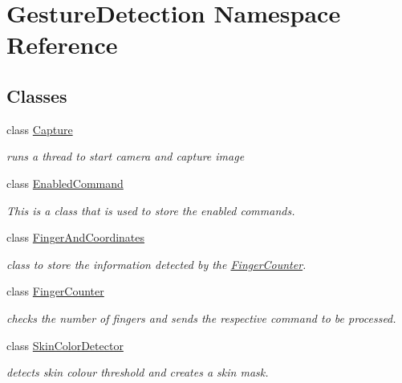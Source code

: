 \hypertarget{namespace_gesture_detection}{}\section{Gesture\+Detection Namespace Reference}
\label{namespace_gesture_detection}
\subsection*{Classes}
\begin{DoxyCompactItemize}
\item 
class \hyperlink{class_gesture_detection_1_1_capture}{Capture}
\begin{DoxyCompactList}\small\item\em runs a thread to start camera and capture image \end{DoxyCompactList}\item 
class \hyperlink{class_gesture_detection_1_1_enabled_command}{Enabled\+Command}
\begin{DoxyCompactList}\small\item\em This is a class that is used to store the enabled commands. \end{DoxyCompactList}\item 
class \hyperlink{class_gesture_detection_1_1_finger_and_coordinates}{Finger\+And\+Coordinates}
\begin{DoxyCompactList}\small\item\em class to store the information detected by the \hyperlink{class_gesture_detection_1_1_finger_counter}{Finger\+Counter}. \end{DoxyCompactList}\item 
class \hyperlink{class_gesture_detection_1_1_finger_counter}{Finger\+Counter}
\begin{DoxyCompactList}\small\item\em checks the number of fingers and sends the respective command to be processed. \end{DoxyCompactList}\item 
class \hyperlink{class_gesture_detection_1_1_skin_color_detector}{Skin\+Color\+Detector}
\begin{DoxyCompactList}\small\item\em detects skin colour threshold and creates a skin mask. \end{DoxyCompactList}\end{DoxyCompactItemize}

